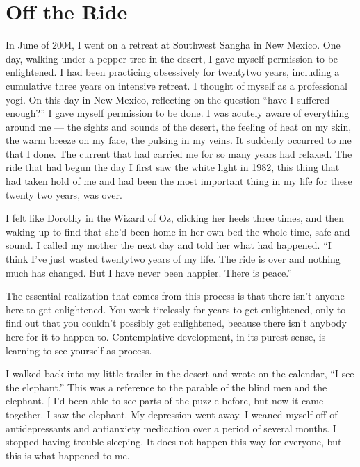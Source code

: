 \documentclass[a5paper,10pt,english]{book}
\begin{document}
\section{Off the Ride}
\label{\detokenize{main-1:off-the-ride}}
\sphinxAtStartPar
In June of 2004, I went on a retreat at Southwest Sangha in New Mexico.
One day, walking under a pepper tree in the desert, I gave myself
permission to be enlightened. I had been practicing obsessively for
twenty\sphinxhyphen{}two years, including a cumulative three years on intensive
retreat. I thought of myself as a professional yogi. On this day in New
Mexico, reflecting on the question “have I suffered enough?” I gave
myself permission to be done. I was acutely aware of everything around
me — the sights and sounds of the desert, the feeling of heat on my
skin, the warm breeze on my face, the pulsing in my veins. It suddenly
occurred to me that I  done. The current that had carried me for so
many years had relaxed. The ride that had begun the day I first saw the
white light in 1982, this thing that had taken hold of me and had been
the most important thing in my life for these twenty two years, was
over.

\sphinxAtStartPar
I felt like Dorothy in the Wizard of Oz, clicking her heels three times,
and then waking up to find that she’d been home in her own bed the whole
time, safe and sound. I called my mother the next day and told her what
had happened. “I think I’ve just wasted twenty\sphinxhyphen{}two years of my life. The
ride is over and nothing much has changed. But I have never been
happier. There is peace.”

\sphinxAtStartPar
The essential realization that comes from this process is that there
isn’t anyone here to get enlightened. You work tirelessly for years to
get enlightened, only to find out that you couldn’t possibly get
enlightened, because there isn’t anybody here for it to happen to.
Contemplative development, in its purest sense, is learning to see
yourself as process.

\sphinxAtStartPar
I walked back into my little trailer in the desert and wrote on the
calendar, “I see the elephant.” This was a reference to the parable of
the blind men and the elephant.
{[}\sphinxurl{http://en.wikipedia.org/wiki/Blind\_men\_and\_an\_elephant}{]} I’d been
able to see parts of the puzzle before, but now it came together. I saw
the elephant. My depression went away. I weaned myself off of
antidepressants and anti\sphinxhyphen{}anxiety medication over a period of several
months. I stopped having trouble sleeping. It does not happen this way
for everyone, but this is what happened to me.
\end{document}
